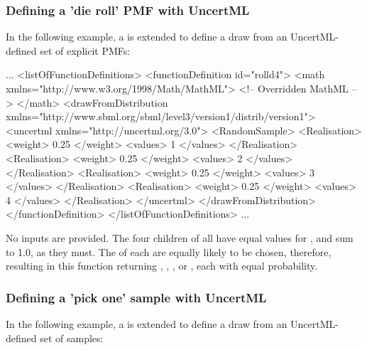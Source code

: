 \documentclass[draftspec]{sbmlpkgspec}
\begin{document}
\subsubsection{Defining a 'die roll' PMF with UncertML}
In the following example, a \FunctionDefinition is extended to define a draw from an UncertML-defined set of explicit PMFs:

\begin{example}
...
  <listOfFunctionDefinitions>
    <functionDefinition id="rolld4">
      <math xmlns="http://www.w3.org/1998/Math/MathML">
        <!-- Overridden MathML -->
      </math>
      <drawFromDistribution xmlns="http://www.sbml.org/sbml/level3/version1/distrib/version1">
         <uncertml xmlns="http://uncertml.org/3.0">
           <RandomSample>
             <Realisation>
               <weight> 0.25 </weight>
               <values> 1 </values>
             </Realisation>
             <Realisation>
               <weight> 0.25 </weight>
               <values> 2 </values>
             </Realisation>
             <Realisation>
               <weight> 0.25 </weight>
               <values> 3 </values>
             </Realisation>
             <Realisation>
               <weight> 0.25 </weight>
               <values> 4 </values>
             </Realisation>
         </uncertml>
      </drawFromDistribution>
    </functionDefinition>
  </listOfFunctionDefinitions>
...
\end{example}

No inputs are provided.  The four  children of  all have equal values for , and sum to 1.0, as they must.  The  of each are equally likely to be chosen, therefore, resulting in this function returning , , , or , each with equal probability.



\subsubsection{Defining a 'pick one' sample with UncertML}
In the following example, a \FunctionDefinition is extended to define a draw from an UncertML-defined set of samples:
\end{document}
